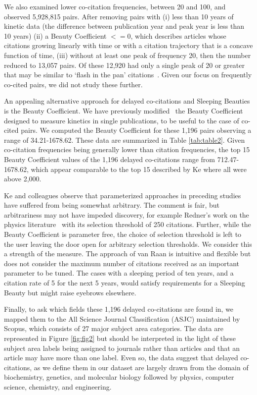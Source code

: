 \documentclass[utf8]{frontiersSCNS}
\begin{document}
We also examined lower co-citation frequencies, between 20 and 100, and observed 5,928,815 pairs. After removing pairs with (i) less than 10 years of kinetic data (the difference between publication year and peak year is less than 10 years) (ii) a Beauty Coefficient $<=0$, which describes articles whose citations growing linearly with time or with a citation trajectory that is a concave function of time, (iii) without at least one peak of frequency 20, then the number reduced to 13,057 pairs. Of these 12,920 had only a single peak of 20 or greater that may be similar to `flash in the pan' citations~\citep{Li2013CitationCO,ye_bornmann_2018}. Given our focus on frequently co-cited pairs, we did not study these further.

An appealing alternative approach for delayed co-citations and Sleeping Beauties is the Beauty Coefficient. We have previously modified~\citep{devarakonda_2020}  the Beauty Coefficient~\citep{Ke2015} designed to measure kinetics in single publications, to be useful to the case of co-cited pairs. We computed the Beauty Coefficient for these 1,196 pairs observing a range of 34.21-1678.62. These data are summarized in Table \ref{tab:table2}.  Given co-citation frequencies being generally lower than citation frequencies, the top 15 Beauty Coefficient values of the 1,196 delayed co-citations range from 712.47-1678.62, which appear comparable to the top 15 described by Ke where all were above 2,000.

Ke and colleagues observe that parameterized approaches in preceding studies have suffered from being somewhat arbitrary. The comment is fair, but arbitrariness may not have impeded discovery, for example Redner's work on the physics literature~\citep{redner_2005} with its selection threshold of 250 citations. Further, while the Beauty Coefficient is parameter free, the choice of selection threshold is left to the user leaving the door open for arbitrary selection thresholds. We consider this a strength of the measure. The approach of van Raan is intuitive and flexible but does not consider the maximum number of citations received as an important parameter to be tuned.  The cases with a sleeping period of ten years, and a citation rate of 5 for the next 5 years, would satisfy requirements for a Sleeping Beauty but might raise eyebrows elsewhere.

Finally, to ask which fields these 1,196 delayed co-citations are found in, we mapped them to the All Science Journal Classification (ASJC) maintained by Scopus, which consists of 27 major subject area categories.  The data are represented in Figure \ref{fig:fig2} but should be interpreted in the light of these subject area labels being assigned to journals rather than articles and that an article may have more than one label. Even so, the data suggest that delayed co-citations, as we define them in our dataset are largely drawn from the domain of biochemistry, genetics, and molecular biology followed by physics, computer science, chemistry, and engineering. 
\end{document}
